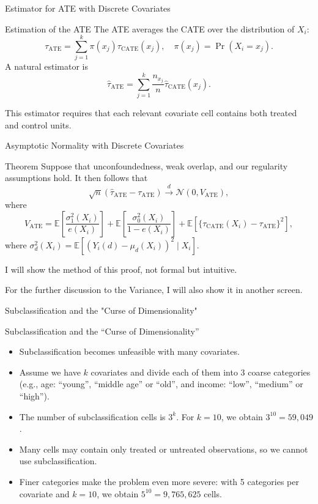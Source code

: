 \documentclass[11pt,aspectratio=169]{beamer}
\begin{document}
\begin{frame}{Estimator for ATE with Discrete Covariates}

\begin{definitionbox}{Estimation of the ATE}
The ATE averages the CATE over the distribution of $X_i$:
$$\tau_{\text{ATE}} = \sum_{j=1}^k \pi(x_j) \tau_{\text{CATE}}(x_j), \quad \pi(x_j) = \Pr(X_i = x_j).$$
A natural estimator is
$$\widehat{\tau}_{\text{ATE}} = \sum_{j=1}^k \frac{n_{x_j}}{n} \widehat{\tau}_{\text{CATE}}(x_j).$$
\end{definitionbox}
This estimator requires that each relevant covariate cell contains both treated and control units.

\end{frame}

\begin{frame}{Asymptotic Normality with Discrete Covariates}

\begin{theorembox}{Theorem}
Suppose that unconfoundedness, weak overlap, and our regularity assumptions hold. It then follows that
$$\sqrt{n}(\widehat{\tau}_{\text{ATE}} - \tau_{\text{ATE}}) \xrightarrow{d} \mathcal{N}(0, V_{\text{ATE}}),$$
where
$$V_{\text{ATE}} = \mathbb{E}\left[\frac{\sigma_1^2(X_i)}{e(X_i)}\right] + \mathbb{E}\left[\frac{\sigma_0^2(X_i)}{1 - e(X_i)}\right] + \mathbb{E}\left[\{\tau_{\text{CATE}}(X_i) - \tau_{\text{ATE}}\}^2\right],$$
where $\sigma_d^2(X_i) = \mathbb{E}[(Y_i(d) - \mu_d(X_i))^2 \mid X_i]$.
\end{theorembox}
I will show the method of this proof, not formal but intuitive.
\end{frame}

\begin{frame}
For the further discussion to the Variance, I will also show it in another screen.

\end{frame}

\begin{frame}{Subclassification and the "Curse of Dimensionality"}


\end{frame}
\begin{frame}{Subclassification and the ``Curse of Dimensionality''}

\begin{itemize}
    \item Subclassification becomes unfeasible with many covariates.
    \item Assume we have $k$ covariates and divide each of them into 3 coarse categories (e.g., age: ``young'', ``middle age'' or ``old'', and income: ``low'', ``medium'' or ``high'').
    \item The number of subclassification cells is $3^k$. For $k = 10$, we obtain $3^{10} = 59,049$.
    \item Many cells may contain only treated or untreated observations, so we cannot use subclassification.
    \item Finer categories make the problem even more severe: with 5 categories per covariate and $k = 10$, we obtain $5^{10} = 9,765,625$ cells.
\end{itemize}
\end{frame}
\end{document}
